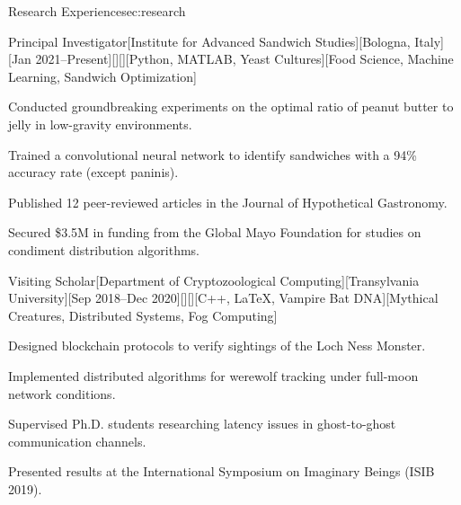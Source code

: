\documentclass[11pt, letterpaper, extended ]{i-am-developer}
\begin{document}
\begin{devCVSection}{Research Experience}{sec:research}
  \begin{devRole}{Principal Investigator}[Institute for Advanced
    Sandwich Studies][Bologna, Italy][Jan
    2021--Present][\faFlask][\faMapMarker][Python, MATLAB, Yeast
    Cultures][Food Science, Machine Learning, Sandwich Optimization]
    \begin{devItemize}
    \item Conducted groundbreaking experiments on the optimal ratio
      of peanut butter to jelly in low-gravity environments.
    \item Trained a convolutional neural network to identify
      sandwiches with a 94\% accuracy rate (except paninis).
    \item Published 12 peer-reviewed articles in the Journal of
      Hypothetical Gastronomy.
    \item Secured \$3.5M in funding from the Global Mayo Foundation
      for studies on condiment distribution algorithms.
    \end{devItemize}
  \end{devRole}

  \begin{devRole}{Visiting Scholar}[Department of Cryptozoological
    Computing][Transylvania University][Sep 2018--Dec
    2020][\faBook][\faMapMarker][C++, LaTeX, Vampire Bat
    DNA][Mythical Creatures, Distributed Systems, Fog Computing]
    \begin{devItemize}
    \item Designed blockchain protocols to verify sightings of the
      Loch Ness Monster.
    \item Implemented distributed algorithms for werewolf tracking
      under full-moon network conditions.
    \item Supervised Ph.D. students researching latency issues in
      ghost-to-ghost communication channels.
    \item Presented results at the International Symposium on
      Imaginary Beings (ISIB 2019).
    \end{devItemize}
  \end{devRole}


\end{devCVSection}
\end{document}
